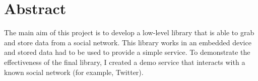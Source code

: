 \part{Abstract}

The main aim of this project is to develop a low-level library that is able to grab and store data from a social network. This library works in an embedded device and stored data had to be used to provide a simple service. To demonstrate the effectiveness of the final library, I created a demo service that interacts with a known social network (for example, Twitter).




\clearpage
